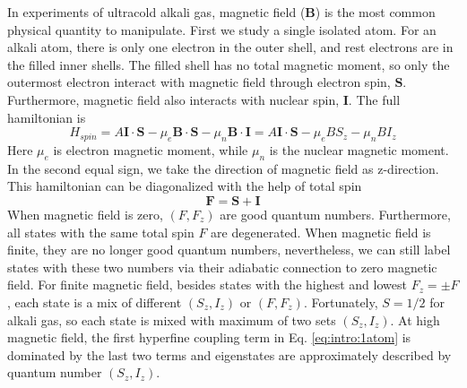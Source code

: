 In experiments of ultracold alkali gas, magnetic field ($\mathbf{B}$) is the most common physical quantity to manipulate.  First we study a  single isolated atom.  For an alkali atom, there is only one electron in the outer shell, and rest electrons are in the filled inner shells.  The filled shell has no total magnetic moment, so only the outermost electron interact with magnetic field through electron spin, $\mathbf{S}$.  Furthermore, magnetic field also interacts with nuclear spin, $\mathbf{I}$.  The full hamiltonian is
\begin{equation}\label{eq:intro:1atom}
H_{spin}=A \mathbf{I}\cdot\mathbf{S}-\mu_{e}\mathbf{B}\cdot\mathbf{S}-{\mu}_{n}\mathbf{B}\cdot\mathbf{I}
=A \mathbf{I}\cdot\mathbf{S}-\mu_{e}{B}{S_{z}}-{\mu}_{n}{B}{I_{z}}
\end{equation}
Here $\mu_{e}$ is electron magnetic moment, while $\mu_n$ is the nuclear magnetic moment.  In the second equal sign, we take the direction of magnetic field as z-direction. This hamiltonian can be diagonalized with the help of total spin 
\begin{equation}
\mathbf{F}=\mathbf{S}+\mathbf{I}
\end{equation}
When magnetic field is zero, $(F,F_{z})$ are good quantum numbers. Furthermore, all states with the same total spin $F$ are degenerated.   When magnetic field is finite, they are no longer good quantum numbers, nevertheless, we can still label states with these two numbers via their adiabatic connection to zero magnetic field.  For finite magnetic field, besides states with the highest and lowest $F_{z}=\pm{}F$, each state is a mix of different $(S_{z}, I_{z})$ or $(F,F_z)$.  Fortunately, $S=1/2$ for alkali gas,  so each state is mixed with maximum of two sets $(S_{z}, I_{z})$. At high magnetic field, the first hyperfine coupling term in Eq. \eqref{eq:intro:1atom} is dominated by the last two terms and  eigenstates are approximately described by quantum number $(S_{z},I_{z})$. 

